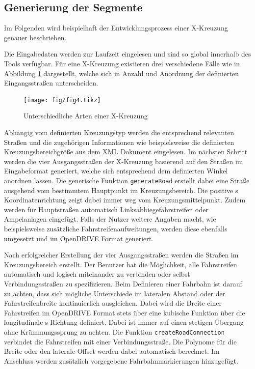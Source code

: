 \subsection{Generierung der Segmente}
Im Folgenden wird beispielhaft der Entwicklungsprozess einer X-Kreuzung genauer beschrieben.

Die Eingabedaten werden zur Laufzeit eingelesen und sind so global innerhalb des Tools verfügbar. Für eine X-Kreuzung existieren drei verschiedene Fälle wie in Abbildung \ref{abb4} dargestellt, welche sich in Anzahl und Anordnung der definierten Eingangsstraßen unterscheiden.

\begin{figure}[!h]
\flushleft
\center \texttt{[image: fig/fig4.tikz]}
\caption{Unterschiedliche Arten einer X-Kreuzung}
\label{abb4}
\end{figure}

Abhängig vom definierten Kreuzungstyp werden die entsprechend relevanten Straßen und die zugehörigen Informationen wie beispielsweise die definierten Kreuzungsbereichgröße aus dem XML Dokument eingelesen. Im nächsten Schritt werden die vier Ausgangsstraßen der X-Kreuzung basierend auf den Straßen im Eingabeformat generiert, welche sich entsprechend dem definierten Winkel anordnen lassen. Die generische Funktion \texttt{generateRoad} erstellt dabei eine Straße ausgehend vom bestimmtem Hauptpunkt im Kreuzungsbereich. Die positive s Koordinatenrichtung zeigt dabei immer weg vom Kreuzungsmittelpunkt. Zudem werden für Hauptstraßen automatisch Linksabbiegefahrstreifen oder Ampelanlagen eingefügt. Falls der Nutzer weitere Angaben macht, wie beispielsweise zusätzliche Fahrstreifenaufweitungen, werden diese ebenfalls umgesetzt und im OpenDRIVE Format generiert.

Nach erfolgreicher Erstellung der vier Ausgangsstraßen werden die Straßen im Kreuzungsbereich erstellt. Der Benutzer hat die Möglichkeit, alle Fahrstreifen automatisch und logisch miteinander zu verbinden oder selbst Verbindungsstraßen zu spezifizieren. Beim Definieren einer Fahrbahn ist darauf zu achten, dass sich mögliche Unterschiede im lateralen Abstand oder der Fahrstreifenbreite kontinuierlich ausgleichen. Dabei wird die Breite einer Fahrstreifen im OpenDRIVE Format stets über eine kubische Funktion über die longitudinale s Richtung definiert. Dabei ist immer auf einen stetigen Übergang ohne Krümmungssprung zu achten. Die Funktion \texttt{createRoadConnection} verbindet die Fahrstreifen mit einer Verbindungsstraße. Die Polynome für die Breite oder den laterale Offset werden dabei automatisch berechnet. Im Anschluss werden zusätzlich vorgegebene Fahrbahnmarkierungen hinzugefügt.


